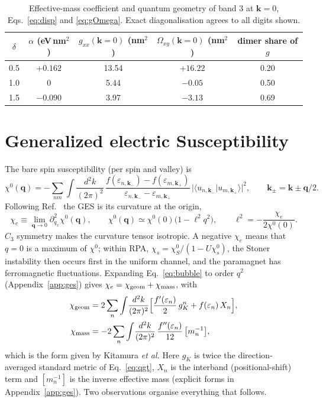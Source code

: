 \documentclass[11pt,a4paper]{article}
\numberwithin{equation}{section}
\newcommand{\bk}{\mathbf{k}}
\newcommand{\bq}{\mathbf{q}}
\newcommand{\chie}{\chi_{e}}
\newcommand{\chig}{\chi_{\rm geom}}
\newcommand{\chim}{\chi_{\rm mass}}
\begin{document}
\begin{table}[t]
\centering\small
\begin{tabular}{@{}ccccc@{}}
\toprule
$\delta$ & $\alpha$ (eV\,nm$^2$) & $g_{xx}(\bk=0)$ (nm$^2$) & $\Omega_{xy}(\bk=0)$ (nm$^2$) & dimer share of $g$\\
\midrule
0.5 & $+0.162$ & 13.54 & $+16.22$ & 0.20\\
1.0 & $0$ & 5.44 & $-0.05$ & 0.50\\
1.5 & $-0.090$ & 3.97 & $-3.13$ & 0.69\\
\bottomrule
\end{tabular}
\caption{Effective-mass coefficient and quantum geometry of band 3 at $\bk=0$, Eqs.~\eqref{eq:disp} and \eqref{eq:gOmega}. Exact diagonalisation agrees to all digits shown.}
\label{tab:geo}
\end{table}





\section{Generalized electric Susceptibility}\label{sec:ges}
The bare spin susceptibility (per spin and valley) is
\begin{equation}
\chi^0(\bq)=-\sum_{nm}\int\!\frac{d^2k}{(2\pi)^2}\,
\frac{f(\varepsilon_{n,\bk_-})-f(\varepsilon_{m,\bk_+})}{\varepsilon_{n,\bk_-}-\varepsilon_{m,\bk_+}}\,
\big|\langle u_{n,\bk_-}|u_{m,\bk_+}\rangle\big|^2,\qquad \bk_\pm=\bk\pm\bq/2 .
\label{eq:bubble}
\end{equation}
Following Ref.~\cite{Kitamura2024} the GES is its curvature at the origin,
\begin{equation}
\chie\equiv\lim_{\bq\to0}\partial_{q_x}^2\chi^0(\bq),\qquad
\chi^0(\bq)\simeq\chi^0(0)\big(1-\ell^2q^2\big),\qquad \ell^2=-\frac{\chie}{2\chi^0(0)} .
\label{eq:GESdef}
\end{equation}
$C_3$ symmetry makes the curvature tensor isotropic. A negative $\chie$ means that $q=0$ is a maximum of $\chi^0$; within RPA, $\chi_s=\chi^0_S/(1-U\chi^0_s)$, the Stoner instability then occurs first in the uniform channel, and the paramagnet has ferromagnetic fluctuations.
Expanding Eq.~\eqref{eq:bubble} to order $q^2$ (Appendix~\ref{app:ges}) gives $\chie=\chig+\chim$, with
\begin{align}
\chig&=2\sum_n\int\!\frac{d^2k}{(2\pi)^2}\Big[\frac{f'(\varepsilon_n)}{2}\,g^{n}_{K}+f(\varepsilon_n)\,X_n\Big], \label{eq:chig}\\
\chim&=-2\sum_n\int\!\frac{d^2k}{(2\pi)^2}\,\frac{f''(\varepsilon_n)}{12}\,\big[m_n^{-1}\big], \label{eq:chim}
\end{align}
which is the form given by Kitamura \emph{et al.} Here $g_K$ is twice the direction-averaged standard metric of Eq.~\eqref{eq:qgt}, $X_n$ is the interband (positional-shift) term and $[m_n^{-1}]$ is the inverse effective mass (explicit forms in Appendix~\ref{app:ges}). Two observations organise everything that follows.
\end{document}
